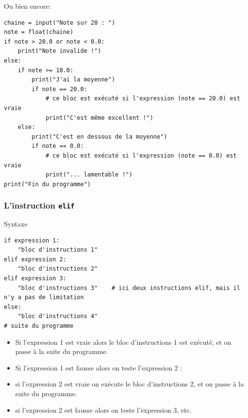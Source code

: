 \documentclass{beamer}
\begin{document}
\begin{frame}

Ou bien encore:
\begin{verbatim}
chaine = input("Note sur 20 : ")
note = float(chaine)
if note > 20.0 or note < 0.0:
    print("Note invalide !")
else:
    if note >= 10.0:
        print("J'ai la moyenne")
        if note == 20.0:
            # ce bloc est exécuté si l'expression (note == 20.0) est vraie
            print("C'est même excellent !")
    else:
        print("C'est en dessous de la moyenne")
        if note == 0.0:
            # ce bloc est exécuté si l'expression (note == 0.0) est vraie
            print("... lamentable !")
print("Fin du programme")
\end{verbatim}
\end{frame}

\begin{frame}
\frametitle{L'instruction \texttt{elif}}

\begin{block}{Syntaxe }

\begin{verbatim}
if expression 1:
    "bloc d'instructions 1"
elif expression 2:
    "bloc d'instructions 2"
elif expression 3:
    "bloc d'instructions 3"    # ici deux instructions elif, mais il n'y a pas de limitation
else:
    "bloc d'instructions 4"
# suite du programme
\end{verbatim}
\begin{itemize}
\item Si l'expression 1 est vraie alors le bloc d'instructions 1 est exécuté, et on passe à la suite du programme.

\item Si l'expression 1 est fausse alors on teste l'expression 2 :

\item si l'expression 2 est vraie on exécute le bloc d'instructions 2, et on passe à la suite du programme.

\item si l'expression 2 est fausse alors on teste l'expression 3, etc.
\end{itemize}

\noindent
\end{block}
\end{frame}
\end{document}
